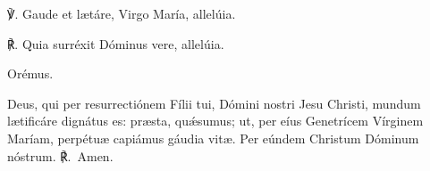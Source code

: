 ℣. Gaude et lætáre, Virgo María, allelúia.

℟. Quia surréxit Dóminus vere, allelúia.

Orémus.

Deus, qui per resurrectiónem Fílii tui, Dómini nostri Jesu Christi, mundum lætificáre dignátus es: præsta, quǽsumus; ut, per eíus Genetrícem Vírginem Maríam, perpétuæ capiámus gáudia vitæ. Per eúndem Christum Dóminum nóstrum.  ℟.~Amen.